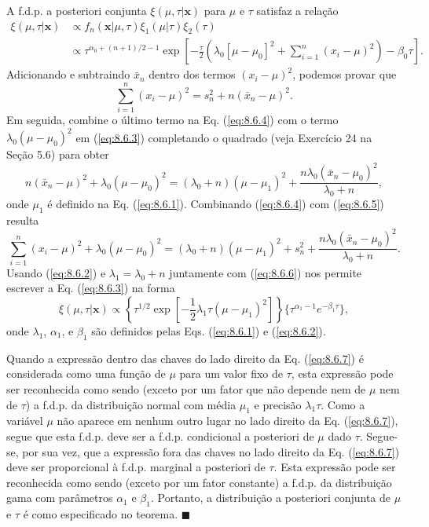 A f.d.p. a posteriori conjunta $\xi(\mu, \tau | \mathbf{x})$ para $\mu$ e $\tau$ satisfaz a relação
\begin{align} \label{eq:8.6.3}
    \xi(\mu, \tau | \mathbf{x}) &\propto f_n(\mathbf{x}|\mu, \tau)\xi_1(\mu|\tau)\xi_2(\tau) \\
    &\propto \tau^{\alpha_0+(n+1)/2 - 1} \exp\left[-\frac{\tau}{2}\left(\lambda_0[\mu-\mu_0]^2 + \sum_{i=1}^n(x_i - \mu)^2\right) - \beta_0\tau\right]. \nonumber
\end{align}
Adicionando e subtraindo $\bar{x}_n$ dentro dos termos $(x_i - \mu)^2$, podemos provar que
\begin{equation} \label{eq:8.6.4}
    \sum_{i=1}^n(x_i - \mu)^2 = s_n^2 + n(\bar{x}_n - \mu)^2.
\end{equation}
Em seguida, combine o último termo na Eq. (\ref{eq:8.6.4}) com o termo $\lambda_0(\mu-\mu_0)^2$ em (\ref{eq:8.6.3}) completando o quadrado (veja Exercício 24 na Seção 5.6) para obter
\begin{equation} \label{eq:8.6.5}
    n(\bar{x}_n - \mu)^2 + \lambda_0(\mu - \mu_0)^2 = (\lambda_0 + n)(\mu - \mu_1)^2 + \frac{n\lambda_0(\bar{x}_n - \mu_0)^2}{\lambda_0 + n},
\end{equation}
onde $\mu_1$ é definido na Eq. (\ref{eq:8.6.1}). Combinando (\ref{eq:8.6.4}) com (\ref{eq:8.6.5}) resulta
\begin{equation} \label{eq:8.6.6}
    \sum_{i=1}^n(x_i - \mu)^2 + \lambda_0(\mu - \mu_0)^2 = (\lambda_0 + n)(\mu - \mu_1)^2 + s_n^2 + \frac{n\lambda_0(\bar{x}_n - \mu_0)^2}{\lambda_0 + n}.
\end{equation}
Usando (\ref{eq:8.6.2}) e $\lambda_1 = \lambda_0 + n$ juntamente com (\ref{eq:8.6.6}) nos permite escrever a Eq. (\ref{eq:8.6.3}) na forma
\begin{equation} \label{eq:8.6.7}
    \xi(\mu, \tau | \mathbf{x}) \propto \left\{ \tau^{1/2} \exp\left[-\frac{1}{2}\lambda_1\tau(\mu - \mu_1)^2\right] \right\} \{\tau^{\alpha_1-1}e^{-\beta_1\tau}\},
\end{equation}
onde $\lambda_1$, $\alpha_1$, e $\beta_1$ são definidos pelas Eqs. (\ref{eq:8.6.1}) e (\ref{eq:8.6.2}).

Quando a expressão dentro das chaves do lado direito da Eq. (\ref{eq:8.6.7}) é considerada como uma função de $\mu$ para um valor fixo de $\tau$, esta expressão pode ser reconhecida como sendo (exceto por um fator que não depende nem de $\mu$ nem de $\tau$) a f.d.p. da distribuição normal com média $\mu_1$ e precisão $\lambda_1\tau$. Como a variável $\mu$ não aparece em nenhum outro lugar no lado direito da Eq. (\ref{eq:8.6.7}), segue que esta f.d.p. deve ser a f.d.p. condicional a posteriori de $\mu$ dado $\tau$. Segue-se, por sua vez, que a expressão fora das chaves no lado direito da Eq. (\ref{eq:8.6.7}) deve ser proporcional à f.d.p. marginal a posteriori de $\tau$. Esta expressão pode ser reconhecida como sendo (exceto por um fator constante) a f.d.p. da distribuição gama com parâmetros $\alpha_1$ e $\beta_1$. Portanto, a distribuição a posteriori conjunta de $\mu$ e $\tau$ é como especificado no teorema. \hfill $\blacksquare$

